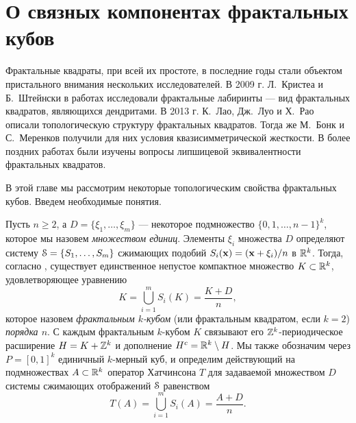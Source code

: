 \chapter{О связных компонентах фрактальных кубов}


Фрактальные квадраты, при всей их простоте, в последние годы стали объектом пристального внимания нескольких исследователей. В 2009 г. Л.~Кристеа и Б.~Штейнски в работах \cite{CS1,CS2} исследовали фрактальные лабиринты  --- вид фрактальных квадратов, являющихся дендритами. В 2013 г. К.~Лао, Дж.~Луо и Х.~Рао \cite{LLR2013} описали топологическую структуру фрактальных квадратов. Тогда же М.~Бонк и С.~Меренков \cite{BM} получили для них условия квазисимметрической жесткости. В более поздних работах \cite{LL,RW} были изучены вопросы липшицевой эквивалентности фрактальных квадратов.

В этой главе мы рассмотрим некоторые топологическим свойства фрактальных кубов.
Введем необходимые понятия.



Пусть $n\geq 2$, а  $ D=\{\xi_1,\ldots,\xi_m\}$ ---  некоторое подмножество  $ \{0,1, \ldots , n-1\}^k$,  которое  мы назовем {\em множеством единиц}. Элементы $\xi_i$ множества $ D$ определяют систему ${\EuScript S}=\{S_1,\ldots,S_m\}$ сжимающих подобий $S_i({\bf{x}})=({\bf{x}}+\xi_i)/n$ в $\mathbb{R}^k$. 
Тогда, согласно  \cite[Theorem(3), p.10]{Hut1981}, существует единственное непустое компактное множество $K\subset \mathbb{R}^k$, удовлетворяющее уравнению 
\begin{equation}\label{Feq} 
K=\bigcup\limits_{i=1}^m S_i(K)=\frac{K+ D}{n},
\end{equation}
которое назовем {\em фрактальным $k$-кубом} (или фрактальным квадратом, если $k=2$) {\em порядка $n$}.
С каждым фрактальным $k$-кубом $K$ связывают его $\mathbb{Z}^k$-периодическое расширение $H=K+\mathbb{Z}^k$  и   дополнение $H^c=\mathbb{R}^k\setminus H$. 
Мы также обозначим через $P=[0,1]^k$ единичный $k$-мерный куб, и  определим действующий на  подмножествах  $A\subset \mathbb{R}^k$  оператор Хатчинсона $T$ для задаваемой множеством $ D$ системы сжимающих отображений ${\EuScript S}$  равенством  
\begin{equation}
T(A)=\bigcup\limits_{i=1}^m S_i(A)=\dfrac{A+ D}{n}.
\end{equation}

